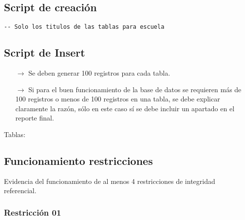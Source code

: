 \subsection{Script de creación}
\begin{lstlisting}[caption={Tablas para la BdDatos}, label={lst:sql_estadios}]
    -- Solo los titulos de las tablas para escuela    
\end{lstlisting}



\subsection{Script de Insert}
\begin{itemize}
    \item[$\rightarrow$] Se deben generar 100 registros para cada tabla.
    \item[$\rightarrow$] Si para el buen funcionamiento de la base de datos se requieren más de 100 registros o
            menos de 100 registros en una tabla, se debe explicar claramente la razón, sólo en este caso
            sí se debe incluir un apartado en el reporte final.
\end{itemize}

Tablas:



\subsection{Funcionamiento restricciones}

Evidencia del funcionamiento de al menos 4 restricciones de integridad referencial.

\subsubsection*{Restricción 01}

